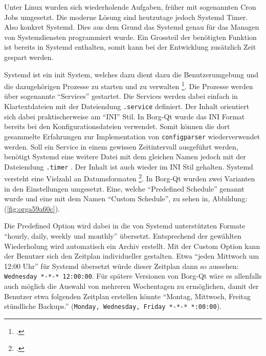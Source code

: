 Unter Linux wurden sich wiederholende Aufgaben, früher mit sogenannten Cron
Jobs umgesetzt. Die moderne Lösung sind heutzutage jedoch Systemd Timer. Also
konkret Systemd. Dies aus dem Grund das Systemd genau für das Managen von
Systemdiensten programmiert wurde. Ein Grossteil der benötigten Funktion ist
bereits in Systemd enthalten, somit kann bei der Entwicklung zusätzlich Zeit
gespart werden.

Systemd ist ein init System, welches dazu dient dazu die Benutzerumgebung und
die dazugehörigen Prozesse zu starten und zu verwalten \footcite{systemd}. Die
Prozesse werden über sogenannte "`Services"' gestartet. Die Services werden dabei
einfach in Klartextdateien mit der Dateiendung \texttt{.service} definiert. Der Inhalt
orientiert sich dabei praktischerweise am "`INI"' Stil. In Borg-Qt wurde das INI
Format bereits bei den Konfigurationsdateien verwendet. Somit können die dort
gesammelte Erfahrungen zur Implementation von \texttt{configparser} wiederverwendet
werden. Soll ein Service in einem gewissen Zeitintervall ausgeführt werden,
benötigt Systemd eine weitere Datei mit dem gleichen Namen jedoch mit der
Dateiendung \texttt{.timer} . Der Inhalt ist auch wieder im INI Stil gehalten. Systemd
versteht eine Vielzahl an Datumsformaten \footcite{systemddate}. In Borg-Qt
wurden zwei Varianten in den Einstellungen umgesetzt. Eine, welche "`Predefined
Schedule"' genannt wurde und eine mit dem Namen "`Custom Schedule"', zu sehen in,
Abbildung:(\ref{fig:orga59a60c}).

Die Predefined Option wird dabei in die von Systemd unterstützten Formate
"`hourly, daily, weekly und monthly"' übersetzt. Entsprechend der gewählten
Wiederholung wird automatisch ein Archiv erstellt. Mit der Custom Option kann
der Benutzer sich den Zeitplan individueller gestalten. Etwa "`jeden Mittwoch
um 12:00 Uhr"' für Systemd übersetzt würde dieser Zeitplan dann so aussehen:
\texttt{Wednesday *-*-* 12:00:00}. Für spätere Versionen von Borg-Qt wäre es
allenfalls auch möglich die Auswahl von mehreren Wochentagen zu ermöglichen,
damit der Benutzer etwa folgenden Zeitplan erstellen könnte "`Montag, Mittwoch,
Freitag stündliche Backups."' (\texttt{Monday, Wednesday, Friday *-*-*
*:00:00}).

